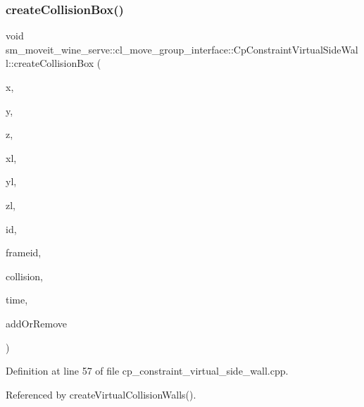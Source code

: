 \subsubsection{\texorpdfstring{create\+Collision\+Box()}{createCollisionBox()}\hspace{0.1cm}{\footnotesize\ttfamily [2/2]}}
{\footnotesize\ttfamily void sm\+\_\+moveit\+\_\+wine\+\_\+serve\+::cl\+\_\+move\+\_\+group\+\_\+interface\+::\+Cp\+Constraint\+Virtual\+Side\+Wall\+::create\+Collision\+Box (\begin{DoxyParamCaption}\item[{float}]{x,  }\item[{float}]{y,  }\item[{float}]{z,  }\item[{float}]{xl,  }\item[{float}]{yl,  }\item[{float}]{zl,  }\item[{std\+::string}]{id,  }\item[{std\+::string}]{frameid,  }\item[{moveit\+\_\+msgs\+::\+Collision\+Object \&}]{collision,  }\item[{const ros\+::\+Time \&}]{time,  }\item[{int}]{add\+Or\+Remove }\end{DoxyParamCaption})}



Definition at line 57 of file cp\+\_\+constraint\+\_\+virtual\+\_\+side\+\_\+wall.\+cpp.



Referenced by create\+Virtual\+Collision\+Walls().


